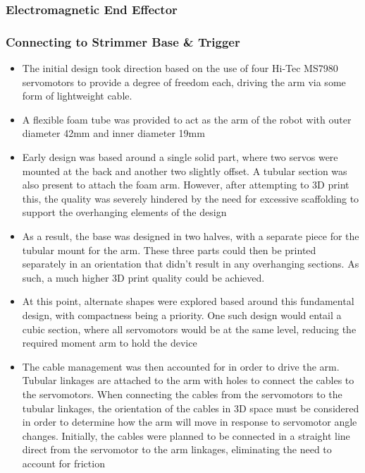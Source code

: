 \documentclass[11pt]{article}
\begin{document}
\subsubsection{Electromagnetic End Effector}

\subsubsection{Connecting to Strimmer Base \& Trigger}




\begin{itemize}
\item{The initial design took direction based on the use of four Hi-Tec MS7980 servomotors to provide a degree of freedom each, driving the arm via some form of lightweight cable.}
\item{A flexible foam tube was provided to act as the arm of the robot with outer diameter 42mm and inner diameter 19mm}
\item{Early design was based around a single solid part, where two servos were mounted at the back and another two slightly offset. A tubular section was also present to attach the foam arm. However, after attempting to 3D print this, the quality was severely hindered by the need for excessive scaffolding to support the overhanging elements of the design}
\item{As a result, the base was designed in two halves, with a separate piece for the tubular mount for the arm. These three parts could then be printed separately in an orientation that didn't result in any overhanging sections. As such, a much higher 3D print quality could be achieved.}
\item{At this point, alternate shapes were explored based around this fundamental design, with compactness being a priority. One such design would entail a cubic section, where all servomotors would be at the same level, reducing the required moment arm to hold the device}
\item{The cable management was then accounted for in order to drive the arm. Tubular linkages are attached to the arm with holes to connect the cables to the servomotors. When connecting the cables from the servomotors to the tubular linkages, the orientation of the cables in 3D space must be considered in order to determine how the arm will move in response to servomotor angle changes. Initially, the cables were planned to be connected in a straight line direct from the servomotor to the arm linkages, eliminating the need to account for friction}

\end{itemize}
\end{document}
